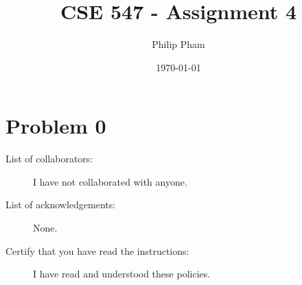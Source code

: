 \documentclass[letterpaper,11pt]{article}
\author{Philip Pham}
\date{\today}
\title{CSE 547 - Assignment 4}
\begin{document}
\maketitle

\section*{Problem 0}

\begin{description}
\item[List of collaborators:] I have not collaborated with anyone.
\item[List of acknowledgements:] None.
\item[Certify that you have read the instructions:] I have read and understood
  these policies.
\end{description}




\end{document}
